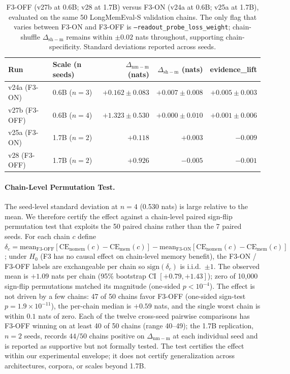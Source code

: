 \documentclass{article}
\newcommand{\dnm}{\Delta_{\mathrm{nm-m}}}
\newcommand{\dsh}{\Delta_{\mathrm{sh-m}}}
\begin{document}
\begin{table}[t]
\centering
\caption{F3-OFF (v27b at 0.6B; v28 at 1.7B) versus F3-ON (v24a at 0.6B;
v25a at 1.7B), evaluated on the same 50 LongMemEval-S validation
chains.  The only flag that varies between F3-ON and F3-OFF is
\texttt{--readout\_probe\_loss\_weight}; chain-shuffle $\dsh$ remains
within $\pm 0.02$ nats throughout, supporting chain-specificity.
Standard deviations reported across seeds.}
\label{tab:f3_off_headline}
\small
\begin{tabular}{llrrr}
\toprule
Run & Scale (n seeds) & $\dnm$ (nats) & $\dsh$ (nats) & evidence\_lift \\
\midrule
v24a (F3-ON)  & 0.6B ($n=3$) & $+0.162 \pm 0.083$ & $+0.007 \pm 0.008$ & $+0.005 \pm 0.003$ \\
v27b (F3-OFF) & 0.6B ($n=4$) & $+1.323 \pm 0.530$ & $+0.000 \pm 0.010$ & $+0.001 \pm 0.006$ \\
\midrule
v25a (F3-ON)  & 1.7B ($n=2$) & $+0.118$           & $+0.003$           & $-0.009$ \\
v28  (F3-OFF) & 1.7B ($n=2$) & $+0.926$           & $-0.005$           & $-0.001$ \\
\bottomrule
\end{tabular}
\end{table}

\paragraph{Chain-Level Permutation Test.}
The seed-level standard deviation at $n=4$ (0.530 nats) is large
relative to the mean.  We therefore certify the effect against a
chain-level paired sign-flip permutation test that exploits the 50
paired chains rather than the 7 paired seeds.  For each chain $c$
define $\delta_c = \mathrm{mean}_{\mathrm{F3\text{-}OFF}}[\mathrm{CE}_{\mathrm{nomem}}(c) - \mathrm{CE}_{\mathrm{mem}}(c)] - \mathrm{mean}_{\mathrm{F3\text{-}ON}}[\mathrm{CE}_{\mathrm{nomem}}(c) - \mathrm{CE}_{\mathrm{mem}}(c)]$;
under $H_0$ (F3 has no causal effect on chain-level memory benefit),
the F3-ON / F3-OFF labels are exchangeable per chain so
$\mathrm{sign}(\delta_c)$ is i.i.d.\ $\pm 1$.  The observed mean is
$+1.09$ nats per chain (95\% bootstrap CI $[+0.79, +1.43]$); zero of
10{,}000 sign-flip permutations matched its magnitude (one-sided
$p < 10^{-4}$).  The effect is not driven by a few chains: 47 of 50
chains favor F3-OFF (one-sided sign-test $p = 1.9\times10^{-11}$), the
per-chain median is $+0.59$ nats, and the single worst chain is
within $0.1$ nats of zero.  Each of the twelve cross-seed pairwise
comparisons has F3-OFF winning on at least 40 of 50 chains (range
40--49); the 1.7B replication, $n=2$ seeds, records $44/50$ chains
positive on $\dnm$ at each individual seed and is reported as
supportive but not formally tested.  The test certifies the effect
within our experimental envelope; it does not certify generalization
across architectures, corpora, or scales beyond 1.7B.
\end{document}

